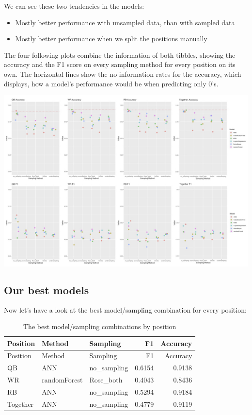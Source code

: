 \documentclass[]{article}
\providecommand{\tightlist}{%
  \setlength{\itemsep}{0pt}\setlength{\parskip}{0pt}}
\begin{document}
We can see these two tendencies in the models:

\begin{itemize}
\tightlist
\item
  Mostly better performance with unsampled data, than with sampled data
\item
  Mostly better performance when we split the positions manually
\end{itemize}

The four following plots combine the information of both tibbles,
showing the accuracy and the F1 score on every sampling method for every
position on its own. The horizontal lines show the no information rates
for the accuracy, which displays, how a model's performance would be
when predicting only 0's.

\includegraphics[width=0.95\linewidth]{Plots_8}

\newpage

\hypertarget{our-best-models}{%
\subsection{Our best models}\label{our-best-models}}

Now let's have a look at the best model/sampling combination for every
position:

\begin{longtable}[]{@{}lllrr@{}}
\caption{The best model/sampling combinations by
position}\tabularnewline
\toprule
Position & Method & Sampling & F1 & Accuracy\tabularnewline
\midrule
\endfirsthead
\toprule
Position & Method & Sampling & F1 & Accuracy\tabularnewline
\midrule
\endhead
QB & ANN & no\_sampling & 0.6154 & 0.9138\tabularnewline
WR & randomForest & Rose\_both & 0.4043 & 0.8436\tabularnewline
RB & ANN & no\_sampling & 0.5294 & 0.9184\tabularnewline
Together & ANN & no\_sampling & 0.4779 & 0.9119\tabularnewline
\bottomrule
\end{longtable}
\end{document}

